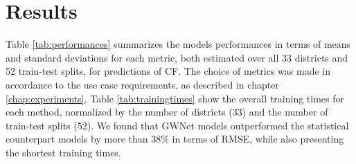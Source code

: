 \chapter{Results}

Table \ref{tab:performances} summarizes the models performances in terms of means and standard deviations for each metric, both estimated over all 33 districts and 52 train-test splits, for predictions of CF.
The choice of metrics was made in accordance to the use case requirements, as described in chapter \ref{chap:experiments}.
Table \ref{tab:trainingtimes} show the overall training times for each method, normalized by the number of districts (33) and the number of train-test splits (52).
We found that GWNet models outperformed the statistical counterpart models by more than 38\% in terms of RMSE, while also presenting the shortest training times.

\begin{table}
\centering
\caption{Performances of different forecasting approaches for the wind power generation use case. Metrics are calculated on basis of CF values at test timestamps.}
\label{tab:performances}
\end{table}

